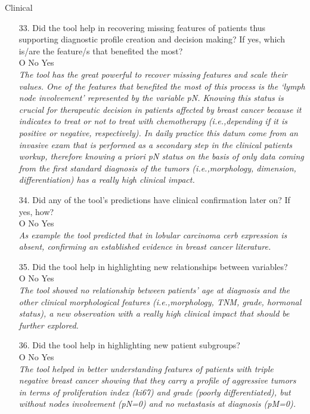 \begin{mdframed}
	{\Large Clinical}
	\begin{enumerate}[resume]
		\item[33.] Did the tool help in recovering missing features of patients thus supporting diagnostic profile creation and decision making? If yes, which is/are the feature/s that benefited the most? \\
		O No  Yes\\
		\textit{The tool has the great powerful to recover missing features and scale their values. One of the features that benefited the most of this process is the `lymph node involvement' represented by the variable pN. Knowing this status is crucial for therapeutic decision in patients affected by breast cancer because it indicates to treat or not to treat with chemotherapy (i.e.,depending if it is positive or negative, respectively). In daily practice this datum come from an invasive exam that is performed as a secondary step in the clinical patients workup, therefore knowing a priori pN status on the basis of only data coming from the first standard diagnosis of the tumors (i.e.,morphology, dimension, differentiation) has a really high clinical impact.}
		\item[34.] Did any of the tool's predictions have clinical confirmation later on?  If yes, how? \\
		O No  Yes\\
		\textit{As example the tool predicted that in lobular carcinoma cerb expression is absent, confirming an established evidence in breast cancer literature.}
		\item[35.] Did the tool help in highlighting new relationships between variables? \\
		O No  Yes\\
		\textit{The tool showed no relationship between patients' age at diagnosis and the other clinical morphological features (i.e.,morphology, TNM, grade, hormonal status), a new observation with a really high clinical impact that should be further explored.}
		\item[36.] Did the tool help in highlighting new patient subgroups? \\
		O No  Yes\\
		\textit{The tool helped in better understanding features of patients with triple negative breast cancer showing that they carry a profile of aggressive tumors in terms of proliferation index (ki67) and grade (poorly differentiated), but without nodes involvement (pN=0) and no metastasis at diagnosis (pM=0).}
	\end{enumerate}
	\label{ques:clinical}
\end{mdframed}

